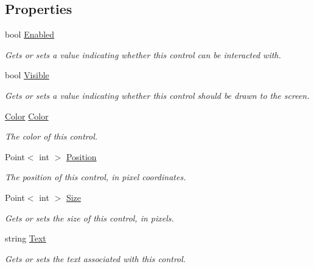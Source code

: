 \subsection*{Properties}
\begin{DoxyCompactItemize}
\item 
bool \hyperlink{interface_tri_devs_1_1_tri_engine2_d_1_1_u_i_1_1_i_control_ac9ede42532a11e5b9257b349936cae61}{Enabled}
\begin{DoxyCompactList}\small\item\em Gets or sets a value indicating whether this control can be interacted with. \end{DoxyCompactList}\item 
bool \hyperlink{interface_tri_devs_1_1_tri_engine2_d_1_1_u_i_1_1_i_control_ac0217db5d8c9b8ee6e226df157aceac6}{Visible}
\begin{DoxyCompactList}\small\item\em Gets or sets a value indicating whether this control should be drawn to the screen. \end{DoxyCompactList}\item 
\hyperlink{struct_tri_devs_1_1_tri_engine2_d_1_1_u_i_1_1_color}{Color} \hyperlink{interface_tri_devs_1_1_tri_engine2_d_1_1_u_i_1_1_i_control_a335ed38fa9721a145ce551c1889bfc49}{Color}
\begin{DoxyCompactList}\small\item\em The color of this control. \end{DoxyCompactList}\item 
Point$<$ int $>$ \hyperlink{interface_tri_devs_1_1_tri_engine2_d_1_1_u_i_1_1_i_control_a521dee44f18d905b5fc0ee94b0f515a2}{Position}
\begin{DoxyCompactList}\small\item\em The position of this control, in pixel coordinates. \end{DoxyCompactList}\item 
Point$<$ int $>$ \hyperlink{interface_tri_devs_1_1_tri_engine2_d_1_1_u_i_1_1_i_control_afc66d577eebbce35df396621c881334c}{Size}
\begin{DoxyCompactList}\small\item\em Gets or sets the size of this control, in pixels. \end{DoxyCompactList}\item 
string \hyperlink{interface_tri_devs_1_1_tri_engine2_d_1_1_u_i_1_1_i_control_a4d46268068ed2824a1ad78be6b3a9ebb}{Text}
\begin{DoxyCompactList}\small\item\em Gets or sets the text associated with this control. \end{DoxyCompactList}\end{DoxyCompactItemize}
